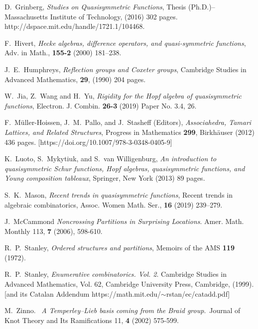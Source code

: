 \documentclass[12pt]{amsart}
\theoremstyle{definition}
\theoremstyle{remark}
\numberwithin{equation}{section}
\begin{document}
\begin{thebibliography}{99}
 D.~Grinberg, 
 \textit{Studies on {Q}uasisymmetric {F}unctions},
{Thesis (Ph.D.)--Massachusetts Institute of Technology},
 (2016) 302 pages.
http://dspace.mit.edu/handle/1721.1/104468.

 F.~Hivert,
\textit{Hecke algebras, difference operators, and quasi-symmetric functions},
 {Adv. in Math.},
{\bf 155-2} (2000) 181--238.

 J.~E.~Humphreys,   \textit{Reflection groups and {C}oxeter groups},
 {Cambridge Studies in Advanced Mathematics},
{\bf 29},
(1990) 204 pages.


 W.~Jia, Z.~Wang and H.~Yu, 
 \textit{Rigidity for the {H}opf algebra of quasisymmetric functions},
{Electron. J. Combin.} {\bf 26-3}
(2019)
 {Paper No. 3.4, 26}.



 F.~Müller-Hoissen, J.~M.~Pallo, and J.~Stasheff  (Editors),
\textit{Associahedra, Tamari Lattices, and Related Structures},
Progress in Mathematics {\bf 299}, Birkh\"auser (2012) 436 pages.
[https://doi.org/10.1007/978-3-0348-0405-9]

K.~Luoto, S.~Mykytiuk, and S.~van Willigenburg,
\textit{An introduction to quasisymmetric {S}chur functions, Hopf algebras, quasisymmetric functions, and Young composition
              tableaux},
{Springer, New York}
(2013)
89 pages.
  
 S.~K.~Mason, 
\textit{Recent trends in quasisymmetric functions},
{Recent trends in algebraic combinatorics},
 {Assoc. Women Math. Ser.},
 {\bf 16} (2019) 
{239--279}.
    
 J.~McCammond
\textit{Noncrossing Partitions in Surprising Locations}.
Amer. Math. Monthly 113, {\bf 7} (2006), 598-610.
%

  R.~P.~Stanley, 
\textit{Ordered structures and partitions},
Memoirs of the AMS {\bf 119} (1972).

 R.~P.~Stanley,
\textit{Enumerative combinatorics. {V}ol. 2}.
{Cambridge Studies in Advanced Mathematics}, Vol. {62},
{Cambridge University Press, Cambridge}, (1999). [and its {Catalan Addendum} https://math.mit.edu/$\sim$rstan/ec/catadd.pdf]

  M.~Zinno.  \textit{A Temperley--Lieb basis coming from the Braid group}. Journal of Knot Theory and Its Ramifications 11, {\bf 4} (2002) 575-599.

\end{thebibliography}
\end{document}
